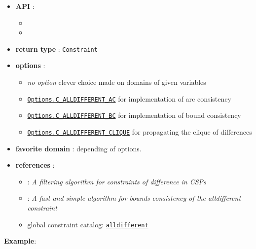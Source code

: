 \begin{itemize}
	\item \textbf{API} :
	\begin{itemize}
		\item {}
		\item {}
	\end{itemize}
	\item \textbf{return type} : \texttt{Constraint}
	\item \textbf{options} :
	\begin{itemize}
		\item \emph{no option} clever choice made on domains of given variables
		\item \hyperlink{calldiffac:calldiffacoptions}{\tt Options.C\_ALLDIFFERENT\_AC} for \cite{ReginAAAI94} implementation of arc consistency
		\item \hyperlink{calldiffbc:calldiffbcoptions}{\tt Options.C\_ALLDIFFERENT\_BC} for \cite{LopezIJCAI03} implementation of bound consistency
		\item \hyperlink{calldiffclique:calldiffcliqueoptions}{\tt Options.C\_ALLDIFFERENT\_CLIQUE} for propagating the clique of differences
	\end{itemize}
	\item \textbf{favorite domain} : depending of options.
	\item \textbf{references} :
      \begin{itemize}
      \item  \cite{ReginAAAI94}: \emph{A filtering algorithm for constraints of difference in CSPs}
      \item  \cite{LopezIJCAI03}: \emph{A fast and simple algorithm for bounds consistency of the alldifferent constraint}
      \item global constraint catalog: \href{http://www.emn.fr/x-info/sdemasse/gccat/Calldifferent.html}{\tt alldifferent}
      \end{itemize}
\end{itemize}



\textbf{Example}:

